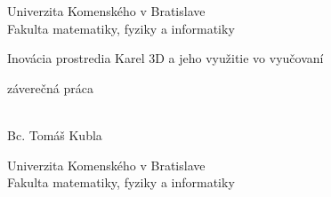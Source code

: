 \documentclass[12pt, oneside]{book}
\def\mfyear{2016}
\def\mftitle{Inovácia prostredia Karel 3D a jeho využitie vo vyučovaní}
\def\mfthesistype{záverečná práca}
\def\mfauthor{Bc. Tomáš Kubla}
\begin{document}
     

\thispagestyle{empty}
\noindent

\begin{minipage}{0.95\textwidth}
\begin{center}
\sc  
\large
\vspace*{0.3cm} Univerzita Komenského v Bratislave\\
\vspace*{0.3cm} Fakulta matematiky, fyziky a informatiky\\
\end{center}
\end{minipage}

\vfill

\begin{minipage}{1.1\textwidth}
\begin{flushright}
\bigskip\bigskip
\begin{center}
\sc\LARGE\mftitle
\end{center}
\centerline{\sc\mfthesistype}

\bigskip\bigskip\bigskip\bigskip
\end{flushright}
\end{minipage}
\vfill

\noindent \mfyear\\
\indent\mfauthor

\eject %


\thispagestyle{empty}
\noindent

\begin{minipage}{0.95\textwidth}
\begin{center}
\sc  
\large
\vspace*{0.3cm} Univerzita Komenského v Bratislave\\
\vspace*{0.3cm} Fakulta matematiky, fyziky a informatiky\\
\end{center}
\end{minipage}

\vfill
\end{document}
